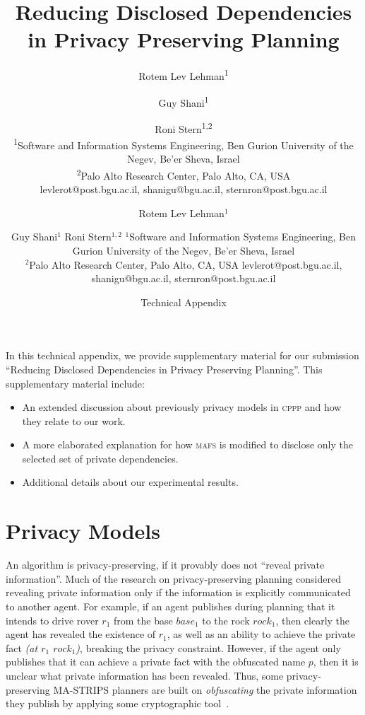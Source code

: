 \documentclass{article}
\author{Rotem Lev Lehman\textsuperscript{\rm 1} \and Guy Shani\textsuperscript{\rm 1} \and Roni Stern\textsuperscript{\rm 1,2} \\ %
\textsuperscript{\rm 1}Software and Information Systems Engineering, Ben Gurion University of the Negev, Be'er Sheva, Israel\\
\textsuperscript{\rm 2}Palo Alto Research Center, Palo Alto, CA, USA\\
levlerot@post.bgu.ac.il, shanigu@bgu.ac.il, sternron@post.bgu.ac.il \\
}
\title{Reducing Disclosed Dependencies in Privacy Preserving Planning}
\author{
Rotem Lev Lehman$^1$\and
Guy Shani$^1$\And
Roni Stern$^{1,2}$
\affiliations
$^1$Software and Information Systems Engineering, Ben Gurion University of the Negev, Be'er Sheva, Israel\\
$^2$Palo Alto Research Center, Palo Alto, CA, USA
\emails
levlerot@post.bgu.ac.il,
shanigu@bgu.ac.il,
sternron@post.bgu.ac.il
}
\author{Technical Appendix}
\newcommand{\cppp}{\textsc {cppp}\xspace}
\newcommand{\mafs}{\textsc {mafs}\xspace}
\newcommand{\commentout}[1]{}
\newcommand{\rotem}[1]{\textbf{\color{red}[ROTEM:#1]}}
\theoremstyle{remark}
\newcommand{\citep}[1]{\cite{#1}}
\begin{document}
\maketitle


In this technical appendix, we provide supplementary material for our submission ``Reducing Disclosed Dependencies in Privacy Preserving Planning''. 
This supplementary material include: 
\begin{itemize}
    \item An extended discussion about previously privacy models in \cppp and how they relate to our work. 
    \item A more elaborated explanation for how \mafs is modified to disclose only the selected set of private dependencies. 
    \item Additional details about our experimental results.   
\end{itemize}


\section{Privacy Models}

An algorithm is privacy-preserving, if it provably does not ``reveal private information''. Much of the research on privacy-preserving planning considered revealing private information  only if the information is explicitly communicated to another agent. For example, if an agent  publishes during planning that it intends to drive rover $r_1$ from the base $base_1$ to the rock $rock_1$, then clearly the agent has revealed the existence of $r_1$, as well as an ability to achieve the private fact {\em (at $r_1$ $rock_1$)},\commentout{\rotem{drive rover $r_1$ from the base $base_1$ to the rock $rock_1$, then clearly the agent has revealed the existence of $r_1$, as well as an ability to achieve the private fact {\em (at $r_1$ $rock_1$)},}}\commentout{bring a truck $t$ to a private location $loc$, then clearly the agent has revealed the existence of this private location, as well as an ability to achieve the private fact {\em (at t loc)},} breaking the privacy constraint. However, if the agent only publishes that it can achieve a private fact with the obfuscated name $p$, then it is unclear what private information has been revealed. Thus, some privacy-preserving MA-STRIPS planners are built on {\em obfuscating} the private information they publish by applying some cryptographic tool~\citep{luis2014planMerging,Borrajo2015MAPR_CMAP}. 
	
\end{document}
